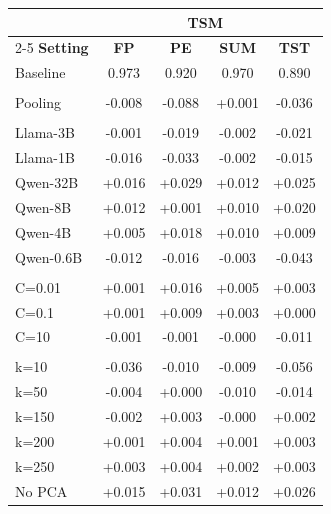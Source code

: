 \begin{tabular}{lcccc}
\toprule
 & \multicolumn{4}{c}{\textbf{TSM~\citep{quaremba2026tsm}}} \\
\cmidrule(lr){2-5}
\textbf{Setting} & \textbf{FP} & \textbf{PE} & \textbf{SUM} & \textbf{TST} \\
\midrule
Baseline & 0.973 & 0.920 & 0.970 & 0.890 \\
\addlinespace
\multicolumn{5}{l}{\textbf{Token Aggregation}} \\
\hspace*{1em}Pooling & -0.008 & -0.088 & +0.001 & -0.036 \\
\addlinespace
\multicolumn{5}{l}{\textbf{Model}} \\
\hspace*{1em}Llama-3B & -0.001 & -0.019 & -0.002 & -0.021 \\
\hspace*{1em}Llama-1B & -0.016 & -0.033 & -0.002 & -0.015 \\
\hspace*{1em}Qwen-32B & +0.016 & +0.029 & +0.012 & +0.025 \\
\hspace*{1em}Qwen-8B & +0.012 & +0.001 & +0.010 & +0.020 \\
\hspace*{1em}Qwen-4B & +0.005 & +0.018 & +0.010 & +0.009 \\
\hspace*{1em}Qwen-0.6B & -0.012 & -0.016 & -0.003 & -0.043 \\
\addlinespace
\multicolumn{5}{l}{\textbf{Regularization Penalty}} \\
\hspace*{1em}C=0.01 & +0.001 & +0.016 & +0.005 & +0.003 \\
\hspace*{1em}C=0.1 & +0.001 & +0.009 & +0.003 & +0.000 \\
\hspace*{1em}C=10 & -0.001 & -0.001 & -0.000 & -0.011 \\
\addlinespace
\multicolumn{5}{l}{\textbf{PCA Activations}} \\
\hspace*{1em}k=10 & -0.036 & -0.010 & -0.009 & -0.056 \\
\hspace*{1em}k=50 & -0.004 & +0.000 & -0.010 & -0.014 \\
\hspace*{1em}k=150 & -0.002 & +0.003 & -0.000 & +0.002 \\
\hspace*{1em}k=200 & +0.001 & +0.004 & +0.001 & +0.003 \\
\hspace*{1em}k=250 & +0.003 & +0.004 & +0.002 & +0.003 \\
\hspace*{1em}No PCA & +0.015 & +0.031 & +0.012 & +0.026 \\
\bottomrule
\end{tabular}
